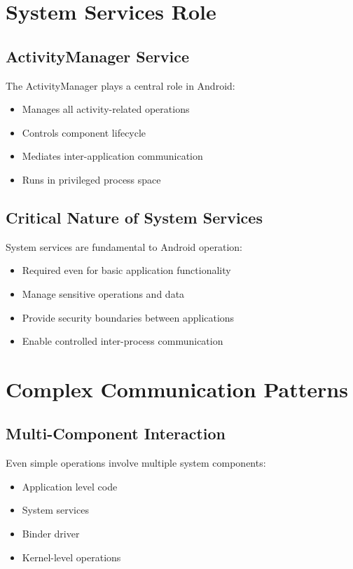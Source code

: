 \documentclass{article}
\begin{document}
\section{System Services Role}
\subsection{ActivityManager Service}
The ActivityManager plays a central role in Android:
\begin{itemize}
    \item Manages all activity-related operations
    \item Controls component lifecycle
    \item Mediates inter-application communication
    \item Runs in privileged process space
\end{itemize}

\subsection{Critical Nature of System Services}
System services are fundamental to Android operation:
\begin{itemize}
    \item Required even for basic application functionality
    \item Manage sensitive operations and data
    \item Provide security boundaries between applications
    \item Enable controlled inter-process communication
\end{itemize}

\section{Complex Communication Patterns}
\subsection{Multi-Component Interaction}
Even simple operations involve multiple system components:
\begin{itemize}
    \item Application level code
    \item System services
    \item Binder driver
    \item Kernel-level operations
\end{itemize}
\end{document}
